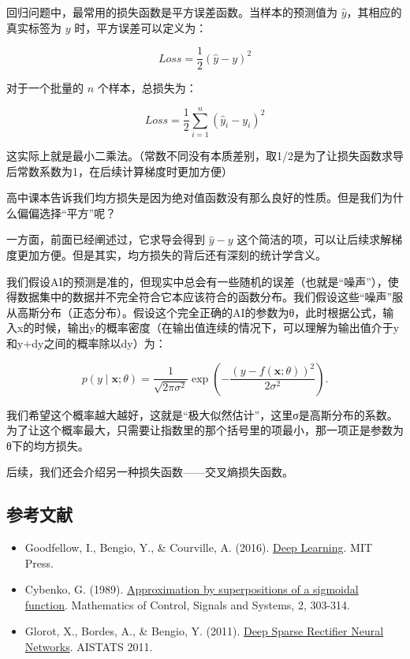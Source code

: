 回归问题中，最常用的损失函数是平方误差函数。当样本的预测值为 \(\hat{y}\)，其相应的真实标签为 \(y\) 时，平方误差可以定义为：

\[
Loss=\frac{1}{2}(\hat{y}-y)^2
\]

对于一个批量的 \(n\) 个样本，总损失为：

\[
Loss=\frac{1}{2}\sum_{i=1}^{n}(\hat{y}_i-y_i)^2
\]

这实际上就是最小二乘法。（常数不同没有本质差别，取1/2是为了让损失函数求导后常数系数为1，在后续计算梯度时更加方便）

高中课本告诉我们均方损失是因为绝对值函数没有那么良好的性质。但是我们为什么偏偏选择``平方''呢？

一方面，前面已经阐述过，它求导会得到 \(\hat{y}-y\) 这个简洁的项，可以让后续求解梯度更加方便。但是其实，均方损失的背后还有深刻的统计学含义。

我们假设AI的预测是准的，但现实中总会有一些随机的误差（也就是``噪声''），使得数据集中的数据并不完全符合它本应该符合的函数分布。我们假设这些``噪声''服从高斯分布（正态分布）。假设这个完全正确的AI的参数为θ，此时根据公式，输入x的时候，输出y的概率密度（在输出值连续的情况下，可以理解为输出值介于y和y+dy之间的概率除以dy）为：

\[
p(y \mid \mathbf{x};\theta)=\frac{1}{\sqrt{2\pi\sigma^2}}\exp\left(-\frac{(y-f(\mathbf{x};\theta))^2}{2\sigma^2}\right).
\]

我们希望这个概率越大越好，这就是``极大似然估计''，这里σ是高斯分布的系数。为了让这个概率最大，只需要让指数里的那个括号里的项最小，那一项正是参数为θ下的均方损失。

后续，我们还会介绍另一种损失函数------交叉熵损失函数。

\hypertarget{ux53c2ux8003ux6587ux732e}{%
\subsection{参考文献}\label{ux53c2ux8003ux6587ux732e}}

\begin{itemize}
\tightlist
\item
  Goodfellow, I., Bengio, Y., \& Courville, A. (2016). \href{https://www.deeplearningbook.org/}{Deep Learning}. MIT Press.
\item
  Cybenko, G. (1989). \href{https://doi.org/10.1007/BF02551274}{Approximation by superpositions of a sigmoidal function}. Mathematics of Control, Signals and Systems, 2, 303-314.
\item
  Glorot, X., Bordes, A., \& Bengio, Y. (2011). \href{https://proceedings.mlr.press/v15/glorot11a.html}{Deep Sparse Rectifier Neural Networks}. AISTATS 2011.
\end{itemize}

